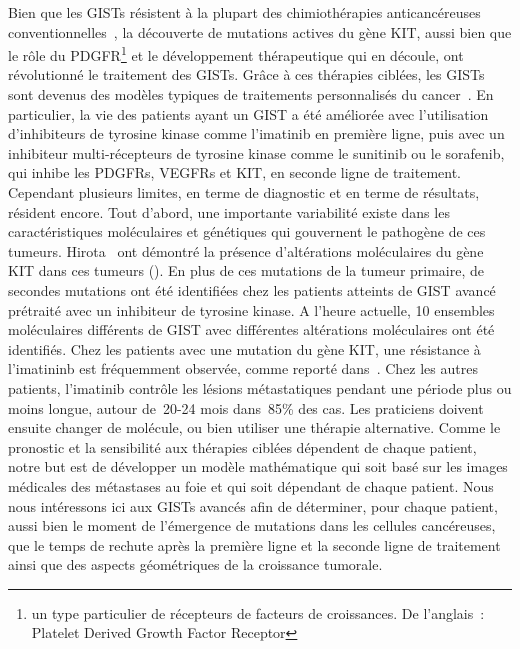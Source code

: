 \documentclass[main.tex]{subfiles}
\begin{document}
Bien que les GISTs résistent à la plupart des chimiothérapies anticancéreuses conventionnelles~\cite{demetri2011gastrointestinal}, 
la découverte de mutations actives du gène KIT, aussi bien que le rôle du PDGFR\footnote{un type particulier de récepteurs de facteurs de croissances. De l'anglais~: Platelet Derived Growth Factor Receptor} et le développement thérapeutique qui en découle, ont révolutionné le traitement des GISTs.
Grâce à ces thérapies ciblées, les GISTs sont devenus des modèles typiques de traitements personnalisés du cancer~\cite{Blay2012}. 
En particulier, la vie des patients ayant un GIST a été améliorée avec l'utilisation d'inhibiteurs de tyrosine kinase comme l'imatinib en première ligne, puis avec un inhibiteur multi-récepteurs de tyrosine kinase comme 
le sunitinib ou le sorafenib,  
qui inhibe les PDGFRs, VEGFRs et KIT, en seconde ligne de traitement. 
Cependant plusieurs limites, en terme de diagnostic et en terme de résultats, résident encore.
Tout d'abord, une importante variabilité existe dans les caractéristiques moléculaires et génétiques qui gouvernent le pathogène de ces tumeurs.
Hirota \etal\ ont démontré la présence d'altérations moléculaires du gène KIT dans ces tumeurs (\cf \cite{Hirota1998}). 
En plus de ces mutations de la tumeur primaire, de secondes mutations ont été identifiées chez les patients atteints de GIST avancé prétraité avec un inhibiteur de tyrosine kinase. A l'heure actuelle, 10 ensembles moléculaires différents de GIST avec différentes altérations moléculaires ont été identifiés. 
Chez les patients avec une mutation du gène KIT, une résistance à l'imatininb est fréquemment observée, comme reporté dans~\cite{Blay2011}. 
Chez les autres patients, l'imatinib contrôle les lésions métastatiques pendant une période plus ou moins longue, autour de~20-24 mois dans~85\% des cas. 
Les praticiens doivent ensuite changer de molécule, ou bien utiliser une thérapie alternative. 
Comme le pronostic et la sensibilité aux thérapies ciblées dépendent de chaque patient, notre but est de développer un modèle mathématique qui soit basé sur les images médicales des métastases au foie et qui soit dépendant de chaque patient. 
Nous nous intéressons ici aux GISTs avancés afin de déterminer, pour chaque patient, aussi bien le moment de l'émergence de mutations dans les cellules cancéreuses, que le temps de rechute après la première ligne et la seconde ligne de traitement ainsi que des aspects géométriques de la croissance tumorale.
\end{document}
